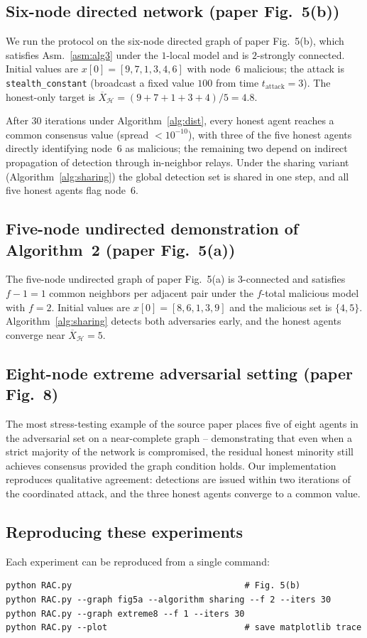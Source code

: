 \documentclass[journal]{IEEEtran}
\newcommand{\HH}{\mathcal{H}}
\begin{document}
\subsection{Six-node directed network (paper Fig.~5(b))}
We run the protocol on the six-node directed graph of paper Fig.~5(b),
which satisfies Asm.~\ref{asm:alg3} under the $1$-local model and is
$2$-strongly connected.  Initial values are
$x[0]=[9,7,1,3,4,6]$ with node~$6$ malicious; the attack is
\texttt{stealth\_constant} (broadcast a fixed value $100$ from time
$t_{\text{attack}}=3$).  The honest-only target is
$\overline{X}_\HH = (9+7+1+3+4)/5 = 4.8$.

After 30 iterations under Algorithm~\ref{alg:dist}, every honest agent
reaches a common consensus value (spread $<10^{-10}$), with three of the
five honest agents directly identifying node~$6$ as malicious; the
remaining two depend on indirect propagation of detection through
in-neighbor relays.  Under the sharing variant
(Algorithm~\ref{alg:sharing}) the global detection set is shared in one
step, and all five honest agents flag node~$6$.

\subsection{Five-node undirected demonstration of Algorithm~2 (paper Fig.~5(a))}
The five-node undirected graph of paper Fig.~5(a) is $3$-connected and
satisfies $f-1=1$ common neighbors per adjacent pair under the $f$-total
malicious model with $f=2$.  Initial values are $x[0]=[8,6,1,3,9]$ and
the malicious set is $\{4,5\}$.  Algorithm~\ref{alg:sharing} detects both
adversaries early, and the honest agents converge near
$\overline{X}_\HH=5$.

\subsection{Eight-node extreme adversarial setting (paper Fig.~8)}
The most stress-testing example of the source paper places five of eight
agents in the adversarial set on a near-complete graph -- demonstrating that
even when a strict majority of the network is compromised, the residual
honest minority still achieves consensus provided the graph condition holds.
Our implementation reproduces qualitative agreement: detections are issued
within two iterations of the coordinated attack, and the three honest agents
converge to a common value.

\subsection{Reproducing these experiments}
Each experiment can be reproduced from a single command:
\begin{verbatim}
python RAC.py                                  # Fig. 5(b)
python RAC.py --graph fig5a --algorithm sharing --f 2 --iters 30
python RAC.py --graph extreme8 --f 1 --iters 30
python RAC.py --plot                           # save matplotlib trace
\end{verbatim}
\end{document}
